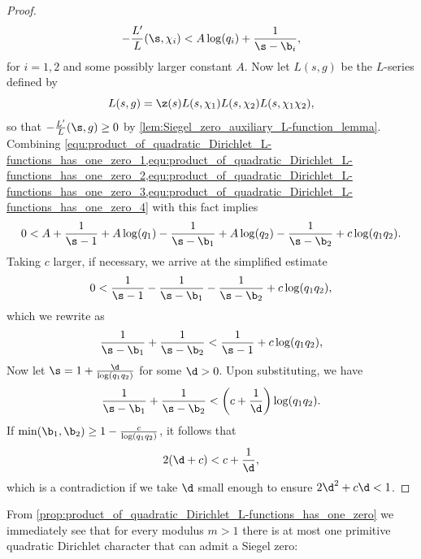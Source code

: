 \begin{proof}
        \begin{equation}\label{equ:product_of_quadratic_Dirichlet_L-functions_has_one_zero_4}
          -\frac{L'}{L}(\s,\chi_{i}) < A\log(q_{i})+\frac{1}{\s-\b_{i}},
        \end{equation}
        for \(i = 1,2\) and some possibly larger constant \(A\). Now let \(L(s,g)\) be the \(L\)-series defined by
        \[
          L(s,g) = \z(s)L(s,\chi_{1})L(s,\chi_{2})L(s,\chi_{1}\chi_{2}),
        \]
        so that \(-\frac{L'}{L}(\s,g) \ge 0\) by \cref{lem:Siegel_zero_auxiliary_L-function_lemma}. Combining \cref{equ:product_of_quadratic_Dirichlet_L-functions_has_one_zero_1,equ:product_of_quadratic_Dirichlet_L-functions_has_one_zero_2,equ:product_of_quadratic_Dirichlet_L-functions_has_one_zero_3,equ:product_of_quadratic_Dirichlet_L-functions_has_one_zero_4} with this fact implies
        \[
        0 < A+\frac{1}{\s-1}+A\log(q_{1})-\frac{1}{\s-\b_{1}}+A\log(q_{2})-\frac{1}{\s-\b_{2}}+c\log(q_{1}q_{2}).
        \]
        Taking \(c\) larger, if necessary, we arrive at the simplified estimate
        \[
          0 < \frac{1}{\s-1}-\frac{1}{\s-\b_{1}}-\frac{1}{\s-\b_{2}}+c\log(q_{1}q_{2}),
        \]
        which we rewrite as
        \[
          \frac{1}{\s-\b_{1}}+\frac{1}{\s-\b_{2}} < \frac{1}{\s-1}+c\log(q_{1}q_{2}),
        \]
        Now let \(\s = 1+\frac{\d}{\log(q_{1}q_{2})}\) for some \(\d > 0\). Upon substituting, we have
        \[
          \frac{1}{\s-\b_{1}}+\frac{1}{\s-\b_{2}} < \left(c+\frac{1}{\d}\right)\log(q_{1}q_{2}).
        \]
        If \(\min(\b_{1},\b_{2}) \ge 1-\frac{c}{\log(q_{1}q_{2})}\), it follows that
        \[
          2(\d+c) < c+\frac{1}{\d},
        \]
        which is a contradiction if we take \(\d\) small enough to ensure \(2\d^{2}+c\d < 1\).
      \end{proof}
    
      From \cref{prop:product_of_quadratic_Dirichlet_L-functions_has_one_zero} we immediately see that for every modulus \(m > 1\) there is at most one primitive quadratic Dirichlet character that can admit a Siegel zero:

